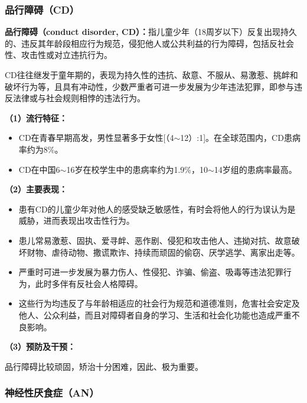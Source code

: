 \subsubsection{品行障碍（CD）}

\begin{keybox}
\textbf{品行障碍（conduct disorder, CD）：}指儿童少年（18周岁以下）反复出现持久的、违反其年龄段相应行为规范，侵犯他人或公共利益的行为障碍，包括反社会性、攻击性或对立违抗行为。

CD往往继发于童年期的，表现为持久性的违抗、敌意、不服从、易激惹、挑衅和破坏行为等，且具有冲动性，少数严重者可进一步发展为少年违法犯罪，即参与违反法律或与社会规则相悖的违法行为。

\vspace{4pt}
\textbf{（1）流行特征：}

\begin{itemize}[leftmargin=*]
    \item CD在青春早期高发，男性显著多于女性[（4$\sim$12）:1]。在全球范围内，CD患病率约为8\%。
    \item CD在中国6$\sim$16岁在校学生中的患病率约为1.9\%，10$\sim$14岁组的患病率最高。
\end{itemize}

\vspace{4pt}
\textbf{（2）主要表现：}

\begin{itemize}[leftmargin=*]
    \item 患有CD的儿童少年对他人的感受缺乏敏感性，有时会将他人的行为误认为是威胁，进而表现出攻击性行为。
    \item 患儿常易激惹、固执、爱寻衅、恶作剧、侵犯和攻击他人、违拗对抗、故意破坏财物、虐待动物、撒谎欺诈、持续而顽固的偷窃、厌学逃学、离家出走等。
    \item 严重时可进一步发展为暴力伤人、性侵犯、诈骗、偷盗、吸毒等违法犯罪行为，此时多伴有反社会人格障碍。
    \item 这些行为均违反了与年龄相适应的社会行为规范和道德准则，危害社会安定及他人、公众利益，而且对障碍者自身的学习、生活和社会化功能也造成严重不良影响。
\end{itemize}

\vspace{4pt}
\textbf{（3）预防及干预：}

品行障碍比较顽固，矫治十分困难，因此、极为重要。
\end{keybox}

\subsubsection{神经性厌食症（AN）}

